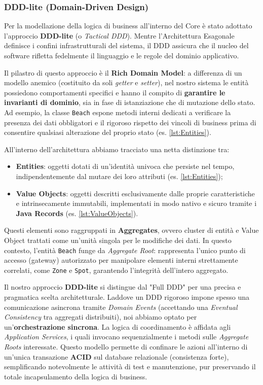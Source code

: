 \documentclass[a4paper,11pt]{article}
\begin{document}
\subsubsection{DDD-lite (Domain-Driven Design)}
Per la modellazione della logica di business all'interno del Core è stato adottato l'approccio \textbf{DDD-lite} (o \textit{Tactical DDD}). Mentre l'Architettura Esagonale definisce i confini infrastrutturali del sistema, il DDD assicura che il nucleo del software rifletta fedelmente il linguaggio e le regole del dominio applicativo.

Il pilastro di questo approccio è il \textbf{Rich Domain Model}: a differenza di un modello anemico (costituito da soli \textit{getter} e \textit{setter}), nel nostro sistema le entità possiedono comportamenti specifici e hanno il compito di \textbf{garantire le invarianti di dominio}, sia in fase di istanziazione che di mutazione dello stato. Ad esempio, la classe \texttt{Beach} espone metodi interni dedicati a verificare la presenza dei dati obbligatori e il rigoroso rispetto dei vincoli di business prima di consentire qualsiasi alterazione del proprio stato (es. \autoref{lst:Entities}).

All'interno dell'architettura abbiamo tracciato una netta distinzione tra:
\begin{itemize}
	\item \textbf{Entities}: oggetti dotati di un'identità univoca che persiste nel tempo, indipendentemente dal mutare dei loro attributi (es. \autoref{lst:Entities});
	\item \textbf{Value Objects}: oggetti descritti esclusivamente dalle proprie caratteristiche e intrinsecamente immutabili, implementati in modo nativo e sicuro tramite i \textbf{Java Records} (es. \autoref{lst:ValueObjects}).
\end{itemize}

Questi elementi sono raggruppati in \textbf{Aggregates}, ovvero cluster di entità e Value Object trattati come un'unità singola per le modifiche dei dati. In questo contesto, l'entità \texttt{Beach} funge da \textit{Aggregate Root}: rappresenta l'unico punto di accesso (gateway) autorizzato per manipolare elementi interni strettamente correlati, come \texttt{Zone} e \texttt{Spot}, garantendo l'integrità dell'intero aggregato.

Il nostro approccio \textbf{DDD-lite} si distingue dal "Full DDD" per una precisa e pragmatica scelta architetturale. Laddove un DDD rigoroso impone spesso una comunicazione asincrona tramite \textit{Domain Events} (accettando una \textit{Eventual Consistency} tra aggregati distribuiti), noi abbiamo optato per un'\textbf{orchestrazione sincrona}. La logica di coordinamento è affidata agli \textit{Application Services}, i quali invocano sequenzialmente i metodi sulle \textit{Aggregate Roots} interessate. Questo modello permette di confinare le azioni all'interno di un'unica transazione \textbf{ACID} sul database relazionale (consistenza forte), semplificando notevolmente le attività di test e manutenzione, pur preservando il totale incapsulamento della logica di business.
\end{document}
